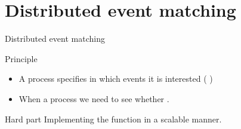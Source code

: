 \section{Distributed event matching}
\begin{slide}{Distributed event matching}
  \begin{centerfig}
  \end{centerfig}
  \begin{block}{Principle}
    \begin{itemize}%
    \item A process specifies in which events it is interested ( )
    \item When a process   we need to see whether  
      .
    \end{itemize}
  \end{block}
  \begin{alertblock}{Hard part}
    Implementing the  function in a scalable manner.
  \end{alertblock}
\end{slide}
